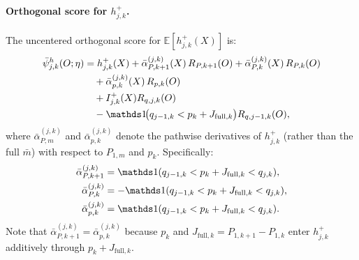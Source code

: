 \paragraph{Orthogonal score for $h_{j,k}^+$.} The uncentered orthogonal score for $\mathbb{E}[h_{j,k}^+(X)]$ is:
\begin{align*}
    \bar{\psi}_{j,k}^h(O;\eta) &= h_{j,k}^+(X) + \bar{\alpha}_{P,k+1}^{(j,k)}(X)\,R_{P,k+1}(O) + \bar{\alpha}_{P,k}^{(j,k)}(X)\,R_{P,k}(O) \\
    &\quad + \bar{\alpha}_{p,k}^{(j,k)}(X)\,R_{p,k}(O) \\
    &\quad + I_{j,k}^+(X)R_{q,j,k}(O) \\
    &\quad - \indicator\!\big(q_{j-1,k} < p_k + J_{\mathrm{full},k}\big)R_{q,j-1,k}(O),
\end{align*}
where $\bar{\alpha}_{P,m}^{(j,k)}$ and $\bar{\alpha}_{p,k}^{(j,k)}$ denote the pathwise derivatives of $h_{j,k}^+$ (rather than the full $\bar{m}$) with respect to $P_{1,m}$ and $p_k$. Specifically:
\begin{align*}
    \bar{\alpha}_{P,k+1}^{(j,k)} &= \indicator(q_{j-1,k} < p_k + J_{\mathrm{full},k} < q_{j,k}), \\
    \bar{\alpha}_{P,k}^{(j,k)} &= -\indicator(q_{j-1,k} < p_k + J_{\mathrm{full},k} < q_{j,k}), \\
    \bar{\alpha}_{p,k}^{(j,k)} &= \indicator(q_{j-1,k} < p_k + J_{\mathrm{full},k} < q_{j,k}).
\end{align*}
Note that $\bar{\alpha}_{P,k+1}^{(j,k)} = \bar{\alpha}_{p,k}^{(j,k)}$ because $p_k$ and $J_{\mathrm{full},k} = P_{1,k+1} - P_{1,k}$ enter $h_{j,k}^+$ additively through $p_k + J_{\mathrm{full},k}$.

